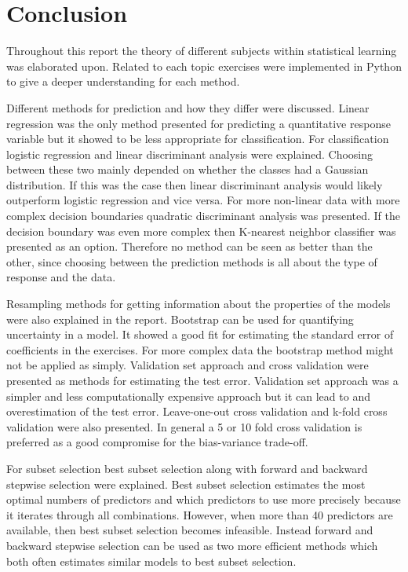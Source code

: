 \chapter{Conclusion}
\label{chp:conc}

Throughout this report the theory of different subjects within statistical learning was elaborated upon. Related to each topic exercises were implemented in Python to give a deeper understanding for each method. 

Different methods for prediction and how they differ were discussed. Linear regression was the only method presented for predicting a quantitative response variable but it showed to be less appropriate for classification. For classification logistic regression and linear discriminant analysis were explained. Choosing between these two mainly depended on whether the classes had a Gaussian distribution. If this was the case then linear discriminant analysis would likely outperform logistic regression and vice versa. For more non-linear data with more complex decision boundaries quadratic discriminant analysis was presented. If the decision boundary was even more complex then K-nearest neighbor classifier was presented as an option. Therefore no method can be seen as better than the other, since choosing between the prediction methods is all about the type of response and the data.

Resampling methods for getting information about the properties of the models were also explained in the report. Bootstrap can be used for quantifying uncertainty in a model. It showed a good fit for estimating the standard error of coefficients in the exercises. For more complex data the bootstrap method might not be applied as simply.
Validation set approach and cross validation were presented as methods for estimating the test error. Validation set approach was a simpler and less computationally expensive approach but it can lead to and overestimation of the test error. Leave-one-out cross validation and k-fold cross validation were also presented. In general a 5 or 10 fold cross validation is preferred as a good compromise for the bias-variance trade-off.

For subset selection best subset selection along with forward and backward stepwise selection were explained. Best subset selection estimates the most optimal numbers of predictors and which predictors to use more precisely because it iterates through all combinations. However, when more than 40 predictors are available, then best subset selection becomes infeasible. Instead forward and backward stepwise selection can be used as two more efficient methods which both often estimates similar models to best subset selection. 

